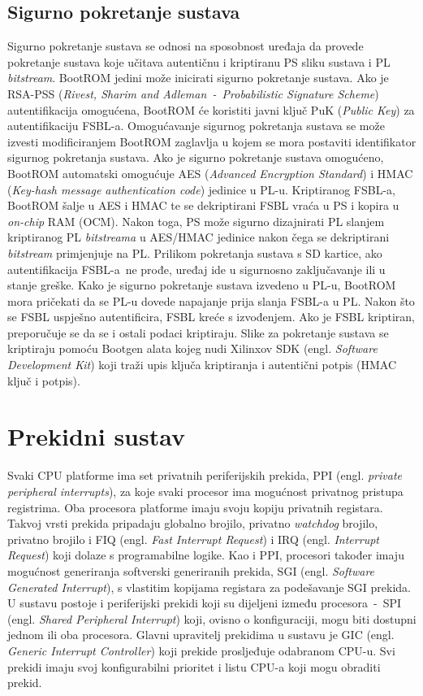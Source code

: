 \documentclass[times, utf8, diplomski, numeric]{fer}
\begin{document}
\subsection{Sigurno pokretanje sustava}
Sigurno pokretanje sustava se odnosi na sposobnost uređaja da provede pokretanje sustava koje učitava autentičnu i
kriptiranu PS sliku sustava i PL \textit{bitstream}. BootROM jedini može inicirati sigurno pokretanje sustava.
Ako je RSA-PSS (\textit{Rivest, Sharim and Adleman~-~Probabilistic Signature Scheme}) autentifikacija  omogućena,
BootROM će koristiti javni ključ PuK (\textit{Public Key}) za autentifikaciju FSBL-a. Omogućavanje sigurnog
pokretanja sustava se može izvesti modificiranjem BootROM zaglavlja u kojem se mora postaviti identifikator sigurnog
pokretanja sustava. Ako je sigurno pokretanje sustava omogućeno, BootROM automatski omogućuje AES (\textit{Advanced
Encryption Standard}) i HMAC (\textit{Key-hash message authentication code}) jedinice u PL-u. Kriptiranog FSBL-a, BootROM
šalje u AES i HMAC te se dekriptirani FSBL vraća u PS i kopira u \textit{on-chip} RAM (OCM). Nakon toga, PS može sigurno
dizajnirati PL slanjem kriptiranog PL \textit{bitstreama} u AES/HMAC jedinice nakon čega se dekriptirani
\textit{bitstream} primjenjuje na PL.
Prilikom pokretanja sustava s SD kartice, ako autentifikacija FSBL-a~ne prođe, uređaj ide u sigurnosno zaključavanje
ili u stanje greške. Kako je sigurno pokretanje sustava izvedeno u PL-u, BootROM mora pričekati da se PL-u dovede napajanje
prija slanja FSBL-a u PL. Nakon što se FSBL uspješno autentificira, FSBL kreće s izvođenjem. Ako je FSBL kriptiran,
preporučuje se da se i ostali podaci kriptiraju. Slike za pokretanje sustava se kriptiraju pomoću Bootgen alata kojeg nudi
Xilinxov SDK (engl. \textit{Software Development Kit}) koji traži upis ključa kriptiranja i autentični potpis (HMAC ključ i
potpis).
\section{Prekidni sustav}
Svaki CPU platforme ima set privatnih periferijskih prekida, PPI (engl. \textit{private peripheral interrupts}),
za koje svaki procesor ima mogućnost privatnog pristupa registrima. Oba procesora platforme imaju svoju kopiju privatnih
registara.
Takvoj vrsti prekida pripadaju globalno brojilo, privatno \textit{watchdog} brojilo, privatno brojilo i FIQ (engl.
\textit{Fast Interrupt Request}) i IRQ (engl. \textit{Interrupt Request}) koji dolaze s programabilne logike.
Kao i PPI, procesori također imaju mogućnost generiranja softverski generiranih prekida, SGI (engl. \textit{Software
Generated Interrupt}), s vlastitim kopijama registara za podešavanje SGI prekida. U sustavu postoje i periferijski prekidi
koji su dijeljeni između procesora~-~SPI (engl. \textit{Shared Peripheral Interrupt}) koji, ovisno o konfiguraciji,
mogu biti dostupni jednom ili oba procesora. Glavni upravitelj prekidima u sustavu je GIC (engl. \textit{Generic
Interrupt Controller}) koji prekide prosljeđuje odabranom CPU-u. Svi prekidi imaju svoj konfigurabilni prioritet
i listu CPU-a koji mogu obraditi prekid.
\end{document}

